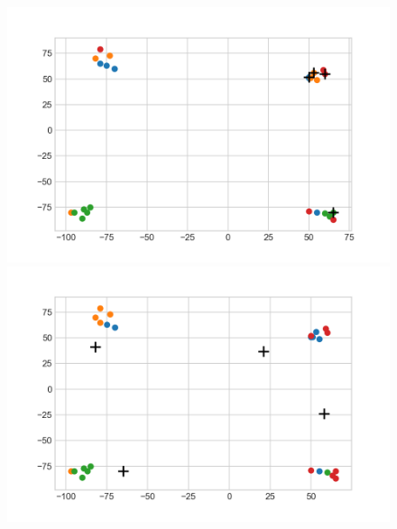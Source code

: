 \begin{figure}[H]
	\centering
	\begin{minipage}{0.35\textwidth}
		\centering
		\includegraphics[width=1\textwidth]{images/kmeans/malonube0}
	\end{minipage}%
	\hspace{0.03\textwidth}
	\begin{minipage}{0.35\textwidth}
		\centering
		\includegraphics[width=1\textwidth]{images/kmeans/malonubefin}
	\end{minipage}%
\end{figure}
